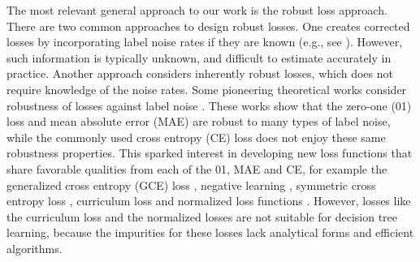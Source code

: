 \documentclass[letterpaper]{article} %
\begin{document}
The most relevant general approach to our work is the robust loss approach.
There are two common approaches to design robust losses.
One creates corrected losses by incorporating label noise rates if they are known 
(e.g., see \cite{natarajan2013learning,patrini2017making}).
However, such information is typically unknown, and difficult to estimate accurately in practice.
Another approach considers inherently robust losses, which does not require
knowledge of the noise rates.
Some pioneering theoretical works consider robustness of losses against label noise 
\cite{manwani2013noise, ghosh2015making, ghosh2017robust}.
These works show that the zero-one (01) loss and mean absolute error (MAE) are
robust to many types of label noise, while the commonly used cross entropy (CE)
loss does not enjoy these same robustness properties.
This sparked interest in developing new loss functions that share favorable qualities from each of the 01, MAE and CE, for example the 
generalized cross entropy (GCE) loss \cite{zhang2018generalized}, 
negative learning \cite{kim2019nlnl}, 
symmetric cross entropy loss \cite{wang2019symmetric}, 
curriculum loss \cite{Lyu2020Curriculum} and 
normalized loss functions \cite{ma2020normalized}.
However, losses like the curriculum loss and the normalized losses are not
suitable for decision tree learning, because the impurities for these losses lack
analytical forms and efficient algorithms.


\end{document}
